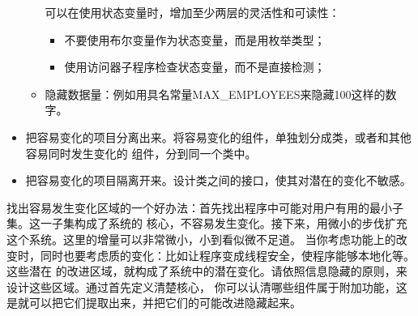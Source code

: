 \documentclass{article}
\begin{document}
\begin{itemize}
\begin{itemize}
        可以在使用状态变量时，增加至少两层的灵活性和可读性：
        \begin{itemize}
            \item 不要使用布尔变量作为状态变量，而是用枚举类型；
            \item 使用访问器子程序检查状态变量，而不是直接检测；
        \end{itemize}
        \item 隐藏数据量：例如用具名常量MAX\_EMPLOYEES来隐藏100这样的数字。
    \end{itemize}
    \item 把容易变化的项目分离出来。将容易变化的组件，单独划分成类，或者和其他容易同时发生变化的
    组件，分到同一个类中。
    \item 把容易变化的项目隔离开来。设计类之间的接口，使其对潜在的变化不敏感。
\end{itemize}
找出容易发生变化区域的一个好办法：首先找出程序中可能对用户有用的最小子集。这一子集构成了系统的
核心，不容易发生变化。接下来，用微小的步伐扩充这个系统。这里的增量可以非常微小，小到看似微不足道。
当你考虑功能上的改变时，同时也要考虑质的变化：比如让程序变成线程安全，使程序能够本地化等。这些潜在
的改进区域，就构成了系统中的潜在变化。请依照信息隐藏的原则，来设计这些区域。通过首先定义清楚核心，
你可以认清哪些组件属于附加功能，这是就可以把它们提取出来，并把它们的可能改进隐藏起来。
\end{document}
